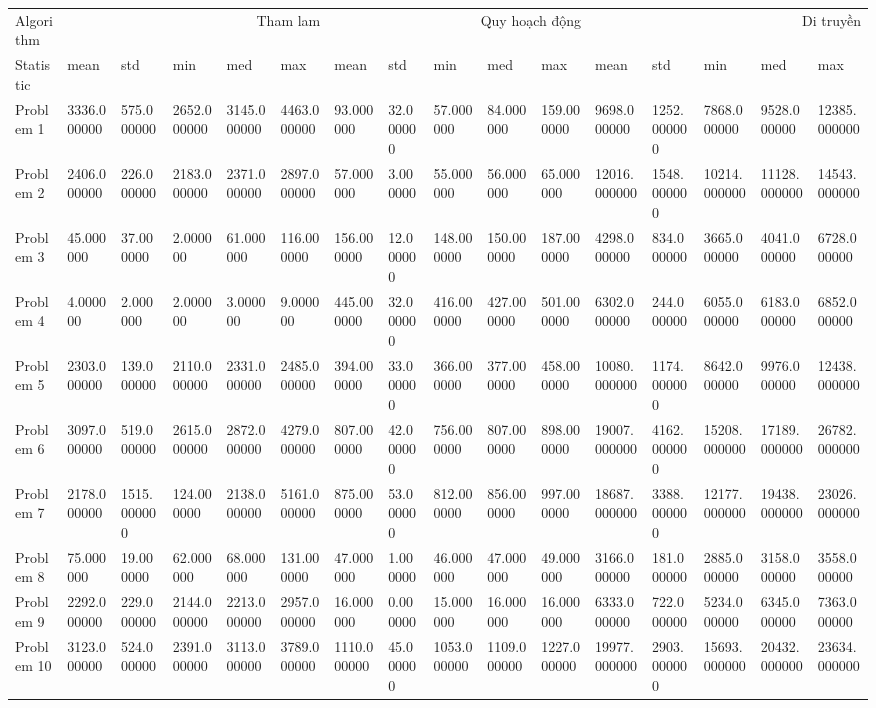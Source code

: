 \begin{tabular}{llllllllllllllll}
\toprule
Algorithm & \multicolumn{5}{r}{Tham lam} & \multicolumn{5}{r}{Quy hoạch động} & \multicolumn{5}{r}{Di truyền} \\
Statistic & mean & std & min & med & max & mean & std & min & med & max & mean & std & min & med & max \\
\midrule
Problem 1 & 3336.000000 & 575.000000 & 2652.000000 & 3145.000000 & 4463.000000 & 93.000000 & 32.000000 & 57.000000 & 84.000000 & 159.000000 & 9698.000000 & 1252.000000 & 7868.000000 & 9528.000000 & 12385.000000 \\
Problem 2 & 2406.000000 & 226.000000 & 2183.000000 & 2371.000000 & 2897.000000 & 57.000000 & 3.000000 & 55.000000 & 56.000000 & 65.000000 & 12016.000000 & 1548.000000 & 10214.000000 & 11128.000000 & 14543.000000 \\
Problem 3 & 45.000000 & 37.000000 & 2.000000 & 61.000000 & 116.000000 & 156.000000 & 12.000000 & 148.000000 & 150.000000 & 187.000000 & 4298.000000 & 834.000000 & 3665.000000 & 4041.000000 & 6728.000000 \\
Problem 4 & 4.000000 & 2.000000 & 2.000000 & 3.000000 & 9.000000 & 445.000000 & 32.000000 & 416.000000 & 427.000000 & 501.000000 & 6302.000000 & 244.000000 & 6055.000000 & 6183.000000 & 6852.000000 \\
Problem 5 & 2303.000000 & 139.000000 & 2110.000000 & 2331.000000 & 2485.000000 & 394.000000 & 33.000000 & 366.000000 & 377.000000 & 458.000000 & 10080.000000 & 1174.000000 & 8642.000000 & 9976.000000 & 12438.000000 \\
Problem 6 & 3097.000000 & 519.000000 & 2615.000000 & 2872.000000 & 4279.000000 & 807.000000 & 42.000000 & 756.000000 & 807.000000 & 898.000000 & 19007.000000 & 4162.000000 & 15208.000000 & 17189.000000 & 26782.000000 \\
Problem 7 & 2178.000000 & 1515.000000 & 124.000000 & 2138.000000 & 5161.000000 & 875.000000 & 53.000000 & 812.000000 & 856.000000 & 997.000000 & 18687.000000 & 3388.000000 & 12177.000000 & 19438.000000 & 23026.000000 \\
Problem 8 & 75.000000 & 19.000000 & 62.000000 & 68.000000 & 131.000000 & 47.000000 & 1.000000 & 46.000000 & 47.000000 & 49.000000 & 3166.000000 & 181.000000 & 2885.000000 & 3158.000000 & 3558.000000 \\
Problem 9 & 2292.000000 & 229.000000 & 2144.000000 & 2213.000000 & 2957.000000 & 16.000000 & 0.000000 & 15.000000 & 16.000000 & 16.000000 & 6333.000000 & 722.000000 & 5234.000000 & 6345.000000 & 7363.000000 \\
Problem 10 & 3123.000000 & 524.000000 & 2391.000000 & 3113.000000 & 3789.000000 & 1110.000000 & 45.000000 & 1053.000000 & 1109.000000 & 1227.000000 & 19977.000000 & 2903.000000 & 15693.000000 & 20432.000000 & 23634.000000 \\
\bottomrule
\end{tabular}
